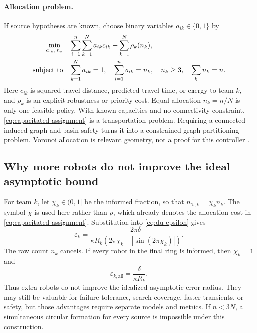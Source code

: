 \documentclass[11pt]{article}
\begin{document}
\paragraph{Allocation problem.}
If source hypotheses are known, choose binary variables $a_{ik}\in\{0,1\}$ by
\begin{align}\label{eq:capacitated-assignment}
    \min_{a_{ik},\,n_k}\quad &
    \sum_{i=1}^n\sum_{k=1}^Na_{ik}c_{ik}+\sum_{k=1}^N\rho_k(n_k),\\
    \text{subject to}\quad &\sum_{k=1}^Na_{ik}=1,\quad
    \sum_{i=1}^na_{ik}=n_k,\quad n_k\geq3,\quad\sum_kn_k=n.\notag
\end{align}
Here $c_{ik}$ is squared travel distance, predicted travel time, or energy to team $k$, and $\rho_k$ is an explicit robustness or priority cost. Equal allocation $n_k=n/N$ is only one feasible policy. With known capacities and no connectivity constraint, \eqref{eq:capacitated-assignment} is a transportation problem. Requiring a connected induced graph and basin safety turns it into a constrained graph-partitioning problem. Voronoi allocation is relevant geometry, not a proof for this controller \cite{cortes2004}.

\subsection{Why more robots do not improve the ideal asymptotic bound}\label{sec:gap1-scale}

For team $k$, let $\chi_k\in(0,1]$ be the informed fraction, so that $n_{\mathcal{X},k}=\chi_kn_k$. The symbol $\chi$ is used here rather than $\rho$, which already denotes the allocation cost in \eqref{eq:capacitated-assignment}. Substitution into \eqref{eq:du-epsilon} gives
\begin{equation}\label{eq:team-epsilon-scale}
    \varepsilon_k=
    \frac{2\pi\delta}
    {\kappa R_k\left(2\pi\chi_k-\left|\sin(2\pi\chi_k)\right|\right)}.
\end{equation}
The raw count $n_k$ cancels. If every robot in the final ring is informed, then $\chi_k=1$ and
\begin{equation}\label{eq:team-all-informed}
    \varepsilon_{k,\mathrm{all}}=\frac{\delta}{\kappa R_k}.
\end{equation}
Thus extra robots do not improve the idealized asymptotic error radius. They may still be valuable for failure tolerance, search coverage, faster transients, or safety, but those advantages require separate models and metrics. If $n<3N$, a simultaneous circular formation for every source is impossible under this construction.
\end{document}
